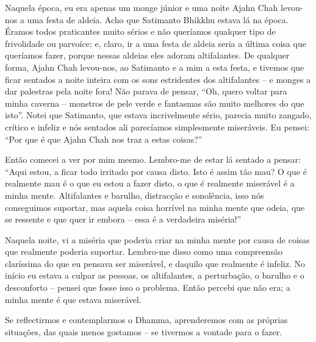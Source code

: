 Naquela época, eu era apenas um monge júnior e uma noite Ajahn Chah levou-nos a
uma festa de aldeia. Acho que Satimanto Bhikkhu estava lá na época. Éramos todos
praticantes muito sérios e não queríamos qualquer tipo de frivolidade ou
parvoíce; e, claro, ir a uma festa de aldeia seria a última coisa que queríamos
fazer, porque nessas aldeias eles adoram altifalantes. De qualquer forma, Ajahn
Chah levou-nos, ao Satimanto e a mim a esta festa, e tivemos que ficar sentados
a noite inteira com os sons estridentes dos altifalantes -- e monges a dar
palestras pela noite fora! Não parava de pensar, ``Oh, quero voltar para minha
caverna -- monstros de pele verde e fantasmas são muito melhores do que isto''.
Notei que Satimanto, que estava incrivelmente sério, parecia muito zangado,
crítico e infeliz e nós sentados ali parecíamos simplesmente miseráveis. Eu
pensei: ``Por que é que Ajahn Chah nos traz a estas coisas?''

Então comecei a ver por mim mesmo. Lembro-me de estar lá sentado a pensar:
``Aqui estou, a ficar todo irritado por causa disto. Isto é assim tão mau? O que
é realmente mau é o que eu estou a fazer disto, o que é realmente miserável é a
minha mente. Altifalantes e barulho, distracção e sonolência, isso nós
conseguimos suportar, mas aquela coisa horrível na minha mente que odeia, que se
ressente e que quer ir embora -- essa é a verdadeira miséria!''

Naquela noite, vi a miséria que poderia criar na minha mente por causa de coisas
que realmente poderia suportar. Lembro-me disso como uma compreensão claríssima
do que eu pensava ser miserável, e daquilo que realmente é infeliz. No início eu
estava a culpar as pessoas, os altifalantes, a perturbação, o barulho e o
desconforto -- pensei que fosse isso o problema. Então percebi que não era; a
minha mente é que estava miserável.

Se reflectirmos e contemplarmos o Dhamma, aprenderemos com as próprias
situações, das quais menos gostamos -- se tivermos a vontade para o fazer.

